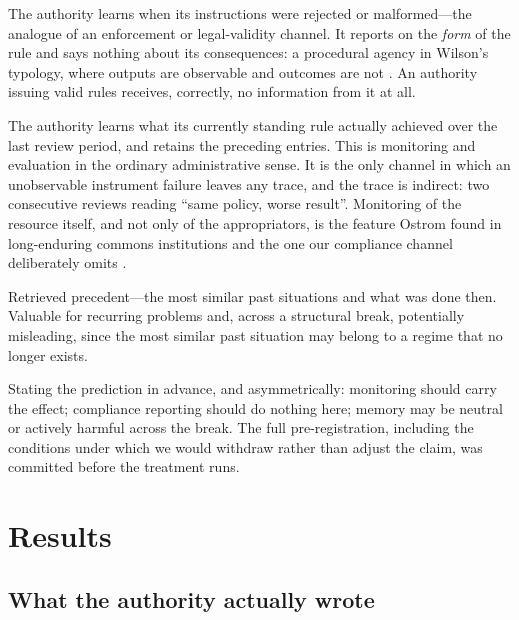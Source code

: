 \documentclass[11pt]{article}
\begin{document}
\begin{description}[leftmargin=0em,style=nextline]
\item[Compliance reporting] The authority learns when its instructions were rejected or
malformed---the analogue of an enforcement or legal-validity channel. It reports on the
\emph{form} of the rule and says nothing about its consequences: a procedural agency in Wilson's
typology, where outputs are observable and outcomes are not \citep{wilson1989bureaucracy}. An
authority issuing valid rules receives, correctly, no information from it at all.
\item[Outcome monitoring] The authority learns what its currently standing rule actually achieved
over the last review period, and retains the preceding entries. This is monitoring and evaluation in
the ordinary administrative sense. It is the only channel in which an unobservable instrument
failure leaves any trace, and the trace is indirect: two consecutive reviews reading ``same policy,
worse result''. Monitoring of the resource itself, and not only of the appropriators, is the feature
Ostrom found in long-enduring commons institutions and the one our compliance channel deliberately
omits \citep{ostrom1990governing}.
\item[Institutional memory] Retrieved precedent---the most similar past situations and what was done
then. Valuable for recurring problems and, across a structural break, potentially misleading, since
the most similar past situation may belong to a regime that no longer exists.
\end{description}

Stating the prediction in advance, and asymmetrically: monitoring should carry the effect;
compliance reporting should do nothing here; memory may be neutral or actively harmful across the
break. The full pre-registration, including the conditions under which we would withdraw rather than
adjust the claim, was committed before the treatment runs.

\section{Results}
\label{sec:results-social}

\ResultsBody




\subsection{What the authority actually wrote}
\end{document}
